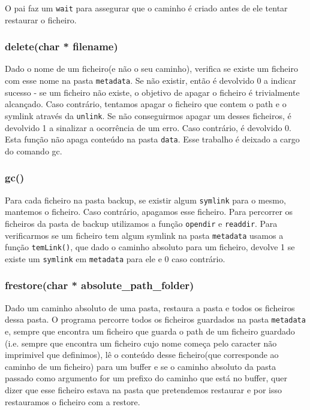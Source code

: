 O pai faz um \texttt{wait} para assegurar que o caminho é criado antes de ele tentar restaurar o ficheiro.

\subsubsection{delete(char * filename)}
Dado o nome de um ficheiro(e não o seu caminho), verifica se existe um ficheiro com esse nome na pasta \texttt{metadata}. Se não existir, então é
devolvido 0 a indicar sucesso - se um ficheiro não existe, o objetivo de apagar o ficheiro é trivialmente alcançado.
Caso contrário, tentamos apagar o ficheiro que contem o path e o symlink através da \texttt{unlink}. Se não
conseguirmos apagar um desses ficheiros, é devolvido 1 a sinalizar a ocorrência de um erro. Caso contrário, é devolvido 0.
Esta função não apaga conteúdo na pasta \texttt{data}. Esse trabalho é deixado a cargo do comando gc.

\subsubsection{gc()}
Para cada ficheiro na pasta backup, se existir algum \texttt{symlink} para o mesmo, mantemos o ficheiro. Caso contrário, apagamos esse ficheiro.
Para percorrer os ficheiros da pasta de backup utilizamos a função \texttt{opendir} e \texttt{readdir}. Para verificarmos se um ficheiro tem algum symlink
na pasta \texttt{metadata} usamos a função \texttt{temLink()}, que dado o caminho absoluto para um ficheiro, devolve 1 se existe um \texttt{symlink} em \texttt{metadata} para ele e 0 caso contrário.

\subsubsection{frestore(char * absolute\_path\_folder)}
Dado um caminho absoluto de uma pasta, restaura a pasta e todos os ficheiros dessa pasta. 
O programa percorre todos os ficheiros guardados na pasta \texttt{metadata} e, sempre que encontra um ficheiro que guarda o path de um ficheiro guardado
(i.e. sempre que encontra um ficheiro cujo nome começa pelo caracter não imprimivel que definimos),
lê o conteúdo desse ficheiro(que corresponde ao caminho de um ficheiro) para um buffer e se o caminho absoluto da pasta passado como argumento for um prefixo 
do caminho que está no buffer, quer dizer que esse ficheiro estava na pasta que pretendemos restaurar e por isso restauramos o ficheiro com a restore.

